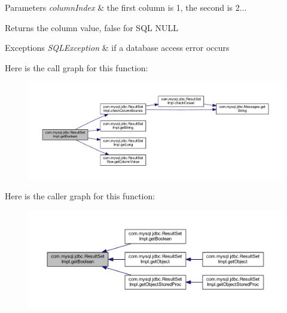 \begin{DoxyParams}{Parameters}
{\em column\+Index} & the first column is 1, the second is 2...\\
\hline
\end{DoxyParams}
\begin{DoxyReturn}{Returns}
the column value, false for S\+QL N\+U\+LL
\end{DoxyReturn}

\begin{DoxyExceptions}{Exceptions}
{\em S\+Q\+L\+Exception} & if a database access error occurs \\
\hline
\end{DoxyExceptions}
Here is the call graph for this function\+:
\nopagebreak
\begin{figure}[H]
\begin{center}
\leavevmode
\includegraphics[width=350pt]{classcom_1_1mysql_1_1jdbc_1_1_result_set_impl_ad64d18ed9c29fd6ab29f1770b2184d6e_cgraph}
\end{center}
\end{figure}
Here is the caller graph for this function\+:
\nopagebreak
\begin{figure}[H]
\begin{center}
\leavevmode
\includegraphics[width=350pt]{classcom_1_1mysql_1_1jdbc_1_1_result_set_impl_ad64d18ed9c29fd6ab29f1770b2184d6e_icgraph}
\end{center}
\end{figure}
\mbox{\label{classcom_1_1mysql_1_1jdbc_1_1_result_set_impl_ac2abb257261b4664efc91722949ad378}} 
